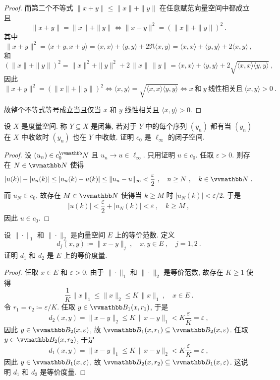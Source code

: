 \begin{proof}
    而第二个不等式 \(\|x + y\| \leq \|x\| + \|y\|\) 在任意赋范向量空间中都成立且
    \[
        \|x + y\| = \|x\| + \|y\| \iff \|x + y\|^2 = (\|x\| + \|y\|)^2\ .
    \]
    其中
    \[
        \|x + y\|^2 = \langle x + y, x + y \rangle = \langle x, x \rangle + \langle y, y \rangle + 2 \Re \langle x, y \rangle = \langle x, x \rangle + \langle y, y \rangle + 2 \langle x, y \rangle\ ,
    \]
    和
    \[
        (\|x\| + \|y\|)^2 = \|x\|^2 + \|y\|^2 + 2\, \|x\|\, \|y\| = \langle x, x \rangle + \langle y, y \rangle + 2 \sqrt{\langle x, x \rangle \langle y, y \rangle}\ ,
    \]
    因此
    \[
        \|x + y\|^2 = (\|x\| + \|y\|)^2 \iff \langle x, y \rangle = \sqrt{\langle x, x \rangle \langle y, y \rangle} \iff x\ \text{和}\ y\ \text{线性相关且}\ \langle x, y \rangle > 0\ .
    \]

    故整个不等式等号成立当且仅当 \(x\) 和 \(y\) 线性相关且 \(\langle x, y \rangle > 0\).
\end{proof}

\begin{exercise}\label{ex:closed-sets-in-metric-spaces}
    设 \(X\) 是度量空间. 称 \(Y \subseteq X\) 是闭集, 若对于 \(Y\) 中的每个序列 \((y_n)\) 都有当 \((y_n)\) 在 \(X\) 中收敛时 \((y_n)\) 也在 \(Y\) 中收敛. 证明 \(c_0\) 是 \(\ell_\infty\) 的闭子空间.
\end{exercise}

\begin{proof}
    设 \((u_n) \in c_0^\N\) 且 \(u_n \to u \in \ell_\infty\). 只用证明 \(u \in c_0\). 任取 \(\varepsilon > 0\). 则存在 \(N \in \N\) 使得
    \[
        |u(k)| - |u_n(k)| \leq |u_n(k) - u(k)| \leq \|u_n - u\|_\infty < \frac{\varepsilon}{2}\ ,\quad n \geq N\ ,\quad k \in \N\ .
    \]
    而 \(u_N \in c_0\), 故存在 \(M \in \N\) 使得当 \(k \geq M\) 时 \(|u_N(k)| < \varepsilon / 2\). 于是
    \[
        |u(k)| < \frac{\varepsilon}{2} + |u_N(k)| < \varepsilon\ ,\quad k \geq M\ ,
    \]
    因此 \(u \in c_0\).
\end{proof}

\begin{exercise}
    设 \(\|\!\cdot\!\|_1\) 和 \(\|\!\cdot\!\|_2\) 是向量空间 \(E\) 上的等价范数. 定义
    \[
        d_j(x, y) \coloneqq \|x - y\|_j\ ,\quad x, y \in E\ ,\quad j = 1, 2\ .
    \]
    证明 \(d_1\) 和 \(d_2\) 是 \(E\) 上的等价度量.
\end{exercise}

\begin{proof}
    任取 \(x \in E\) 和 \(\varepsilon > 0\). 由于 \(\|\!\cdot\!\|_1\) 和 \(\|\!\cdot\!\|_2\) 是等价范数, 故存在 \(K \geq 1\) 使得
    \[
        \frac{1}{K} \|x\|_1 \leq \|x\|_2 \leq K\, \|x\|_1\ ,\quad x \in E\ .
    \]
    令 \(r_1 = r_2 \coloneqq \varepsilon / K\). 任取 \(y \in \B_1(x, r_1)\), 于是
    \[
        d_2(x, y) = \|x - y\|_2 \leq K\, \|x - y\|_1 < K \frac{\varepsilon}{K} = \varepsilon\ ,
    \]
    因此 \(y \in \B_2(x, \varepsilon)\), 故 \(\B_1(x, r_1) \subseteq \B_2(x, \varepsilon)\). 任取 \(y \in \B_2(x, r_2)\), 于是
    \[
        d_1(x, y) = \|x - y\|_1 \leq K\, \|x - y\|_2 < K \frac{\varepsilon}{K} = \varepsilon\ ,
    \]
    因此 \(y \in \B_1(x, \varepsilon)\), 故 \(\B_2(x, r_2) \subseteq \B_1(x, \varepsilon)\). 这说明 \(d_1\) 和 \(d_2\) 是等价度量.
\end{proof}

